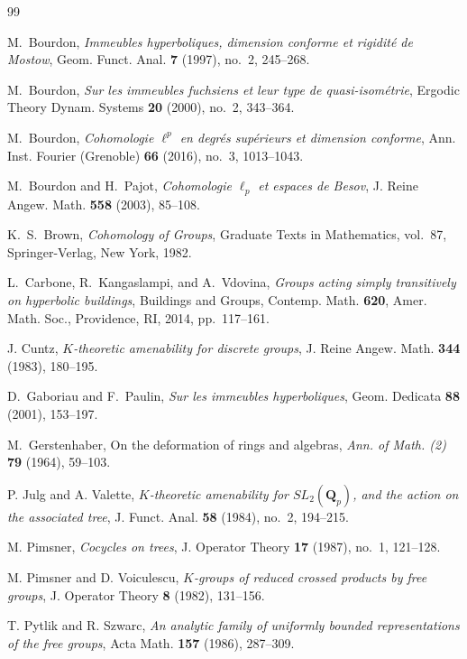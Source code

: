 \documentclass[12pt]{amsproc}
\theoremstyle{plain}
\theoremstyle{definition}
\numberwithin{equation}{section}
\begin{document}
\begin{thebibliography}{99}

M.~Bourdon,
\textit{Immeubles hyperboliques, dimension conforme et rigidit\'e de Mostow},
Geom. Funct. Anal. \textbf{7} (1997), no.~2, 245--268.

M.~Bourdon,
\textit{Sur les immeubles fuchsiens et leur type de quasi-isom\'etrie},
Ergodic Theory Dynam. Systems \textbf{20} (2000), no.~2, 343--364.

M.~Bourdon,
\textit{Cohomologie $\ell^p$ en degr\'es sup\'erieurs et dimension conforme},
Ann. Inst. Fourier (Grenoble) \textbf{66} (2016), no.~3, 1013--1043.

M.~Bourdon and H.~Pajot,
\textit{Cohomologie $\ell_p$ et espaces de Besov},
J. Reine Angew. Math. \textbf{558} (2003), 85--108.

K.~S.~Brown,
\emph{Cohomology of Groups},
Graduate Texts in Mathematics, vol.~87, Springer-Verlag, New York, 1982.

L.~Carbone, R.~Kangaslampi, and A.~Vdovina,
\textit{Groups acting simply transitively on hyperbolic buildings},
Buildings and Groups, Contemp. Math. \textbf{620},
Amer. Math. Soc., Providence, RI, 2014, pp.~117--161.

J. Cuntz,
\emph{$K$-theoretic amenability for discrete groups},
J. Reine Angew. Math. \textbf{344} (1983), 180--195.

D.~Gaboriau and F.~Paulin,
\textit{Sur les immeubles hyperboliques},
Geom. Dedicata \textbf{88} (2001), 153--197.

M.~Gerstenhaber,
On the deformation of rings and algebras,
\emph{Ann. of Math. (2)} \textbf{79} (1964), 59--103.

P. Julg and A. Valette,
\emph{$K$-theoretic amenability for $SL_2(\mathbf Q_p)$, and the action on the associated tree},
J. Funct. Anal. \textbf{58} (1984), no.~2, 194--215.

M. Pimsner,
\emph{Cocycles on trees},
J. Operator Theory \textbf{17} (1987), no.~1, 121--128.

M. Pimsner and D. Voiculescu,
\emph{$K$-groups of reduced crossed products by free groups},
J. Operator Theory \textbf{8} (1982), 131--156.

T. Pytlik and R. Szwarc,
\emph{An analytic family of uniformly bounded representations of the free groups},
Acta Math. \textbf{157} (1986), 287--309.


\end{thebibliography}
\end{document}
